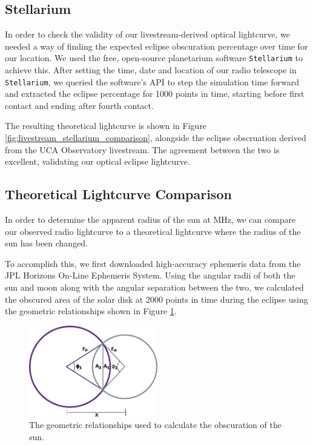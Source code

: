 \subsection{\label{sec:stellarium}Stellarium}

In order to check the validity of our livestream-derived optical lightcurve, we needed a way of finding the expected eclipse obscuration percentage over time for our location.
We used the free, open-source planetarium software \texttt{Stellarium} to achieve this.
After setting the time, date and location of our radio telescope in \texttt{Stellarium}, we queried the software's API to step the simulation time forward and extracted the eclipse percentage for 1000 points in time, starting before first contact and ending after fourth contact.

The resulting theoretical lightcurve is shown in Figure \ref{fig:livestream_stellarium_comparison}, alongside the eclipse obscruation derived from the UCA Observatory livestream.
The agreement between the two is excellent, validating our optical eclipse lightcurve.


\subsection{\label{sec:theoreticalLightcurves}Theoretical Lightcurve Comparison}

In order to determine the apparent radius of the sun at \unit[1420]{MHz}, we can compare our observed radio lightcurve to a theoretical lightcurve where the radius of the sun has been changed.

To accomplish this, we first downloaded high-accuracy ephemeris data from the JPL Horizons On-Line Ephemeris System. Using the angular radii of both the sun and moon along with the angular separation between the two, we calculated the obscured area of the solar disk at 2000 points in time during the eclipse using the geometric relationships shown in Figure \ref{fig:eclipse_geometry}.

\begin{figure}
  \includegraphics[width=0.5\textwidth]{figures/drawing}
  \caption{\label{fig:eclipse_geometry} The geometric relationships used to calculate the obscuration of the sun.}
\end{figure}

